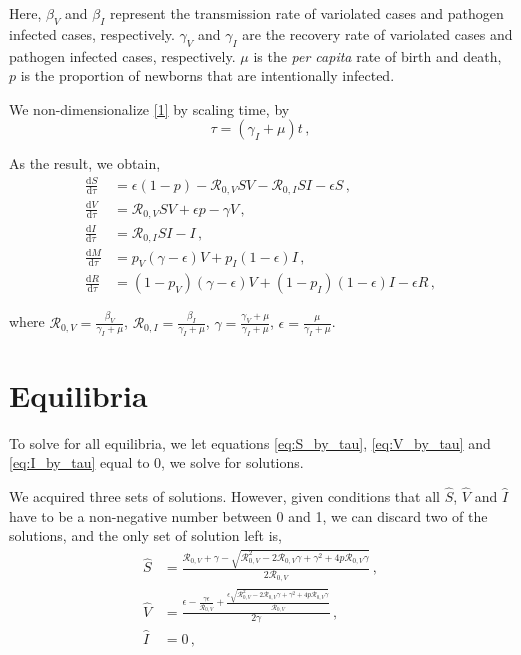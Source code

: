 \documentclass[12pt]{article}
\newcommand\dbyd[2]{\frac{\mathrm d{#1}}{\mathrm d{#2}}}
\newcommand{\R}{\mathcal{R}}
\newcommand{\pmV}{p_{V}}
\newcommand{\pmI}{p_{I}}
\begin{document}
Here, $\beta_V$ and $\beta_I$ represent the transmission rate of variolated cases and pathogen infected cases, respectively. $\gamma_V$ and $\gamma_I$ are the recovery rate of variolated cases and pathogen infected cases, respectively.
$\mu$ is the \emph{per capita} rate of birth and death, $p$ is the
proportion of newborns that are intentionally infected.

We non-dimensionalize \autoref{1} by scaling time, by
\begin{equation}
\tau=(\gamma_I+\mu)t \,,
\end{equation}

As the result, we obtain,
\begin{subequations}\label{eq:base_ODE}
\begin{align}
\dbyd{S}{\tau}&=\epsilon(1-p)-\R_{0,V} SV-\R_{0,I} SI-\epsilon S\,, \label{eq:S_by_tau}\\
\dbyd{V}{\tau}&=\R_{0,V} SV+\epsilon p-\gamma V\,, \label{eq:V_by_tau}\\
\dbyd{I}{\tau}&=\R_{0,I} SI-I\,, \label{eq:I_by_tau}\\
\dbyd{M}{\tau}&=\pmV(\gamma-\epsilon) V+\pmI(1-\epsilon) I\,,\\
\dbyd{R}{\tau}&=(1-\pmV)(\gamma-\epsilon) V+(1-\pmI)(1-\epsilon) I-\epsilon R\,,
\end{align}
\end{subequations}

where $\R_{0,V}=\frac{\beta_V}{\gamma_I+\mu}$, $\R_{0,I}=\frac{\beta_I}{\gamma_I+\mu}$, $\gamma=\frac{\gamma_V+\mu}{\gamma_I+\mu}$, $\epsilon=\frac{\mu}{\gamma_I+\mu}$.

\section{Equilibria}

To solve for all equilibria, we let equations \autoref{eq:S_by_tau}, \autoref{eq:V_by_tau} and \autoref{eq:I_by_tau} equal to 0, we solve for solutions.

We acquired three sets of solutions. However, given conditions that all $\hat{S}$, $\hat{V}$ and $\hat{I}$ have to be a non-negative number between 0 and 1, we can discard two of the solutions, and the only set of solution left is, 
\begin{subequations}
\begin{align}
\hat{S}&= \frac{\R_{0,V}+\gamma-\sqrt{\R_{0,V}^2-2\R_{0,V}\gamma+\gamma^2+4p\R_{0,V}\gamma}}{2\R_{0,V}}\,, \label{eq:Shat}\\
\hat{V}&= \frac{\epsilon-\frac{\gamma\epsilon}{\R_{0,V}}+\frac{\epsilon\sqrt{\R_{0,V}^2-2\R_{0,V}\gamma+\gamma^2+4p\R_{0,V}\gamma}}{\R_{0,V}}}{2\gamma}\,, \label{eq:Vhat}\\
\hat{I}&=0\,, \label{eq:Ihat}
\end{align}
\end{subequations}
\end{document}
